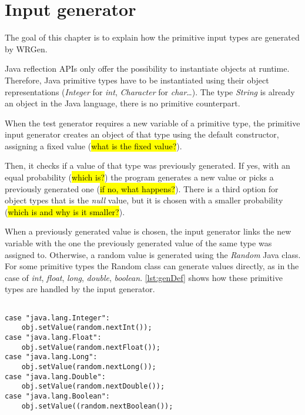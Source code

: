 \section{Input generator}\label{sec:pig}
The goal of this chapter is to explain how the primitive input types are generated by WRGen.

Java reflection APIs only offer the possibility to instantiate objects at runtime. Therefore, Java primitive types have to be instantiated using their object representations (\emph{Integer} for \emph{int}, \emph{Character} for \emph{char}\dots). The type \emph{String} is already an object in the Java language, there is no primitive counterpart.

When the test generator requires a new variable of a primitive type, the primitive input generator creates an object of that type using the default constructor, assigning a fixed value (\hl{what is the fixed value?}). 

Then, it checks if a value of that type was previously generated. If yes, with an equal probability (\hl{which is?}) the program generates a new value or picks a previously generated one (\hl{if no, what happens?}). There is a third option for object types that is the \emph{null} value, but it is chosen with a smaller probability (\hl{which is and why is it smaller?}).

When a previously generated value is chosen, the input generator links the new variable with the one the previously generated value of the same type was assigned to. Otherwise, a random value is generated using the \textit{Random} Java class. For some primitive types the Random class can generate values directly, as in the case of \textit{int}, \textit{float}, \textit{long}, \textit{double}, \textit{boolean}. \autoref{lst:genDef} shows how these primitive types are handled by the input generator. 

\begin{lstlisting}[caption={Random default generator},label={lst:genDef}]% Start your code-block

case "java.lang.Integer":
	obj.setValue(random.nextInt());
case "java.lang.Float":
	obj.setValue(random.nextFloat());
case "java.lang.Long":
	obj.setValue(random.nextLong());
case "java.lang.Double":
	obj.setValue(random.nextDouble());
case "java.lang.Boolean":
	obj.setValue((random.nextBoolean());
\end{lstlisting}

